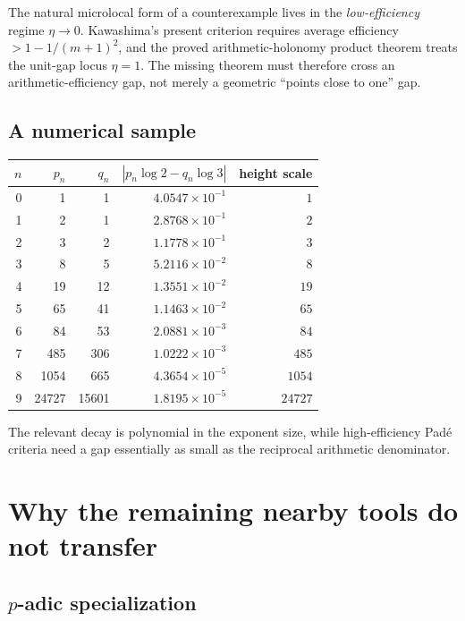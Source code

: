 \documentclass[11pt]{article}
\theoremstyle{definition}
\begin{document}
\begin{provedbox}
The natural microlocal form of a counterexample lives in the \emph{low-efficiency} regime
$\eta\to0$.  Kawashima's present criterion requires average efficiency
$>1-1/(m+1)^2$, and the proved arithmetic-holonomy product theorem treats the unit-gap locus
$\eta=1$.  The missing theorem must therefore cross an arithmetic-efficiency gap, not merely a
geometric ``points close to one'' gap.
\end{provedbox}

\subsection{A numerical sample}

\begin{center}
\begin{tabular}{@{}rrrrr@{}}
\toprule
$n$ & $p_n$ & $q_n$ & $|p_n\log2-q_n\log3|$ & height scale \\
\midrule
0 & 1 & 1 & $4.0547\times10^{-1}$ & $1$ \\
1 & 2 & 1 & $2.8768\times10^{-1}$ & $2$ \\
2 & 3 & 2 & $1.1778\times10^{-1}$ & $3$ \\
3 & 8 & 5 & $5.2116\times10^{-2}$ & $8$ \\
4 & 19 & 12 & $1.3551\times10^{-2}$ & $19$ \\
5 & 65 & 41 & $1.1463\times10^{-2}$ & $65$ \\
6 & 84 & 53 & $2.0881\times10^{-3}$ & $84$ \\
7 & 485 & 306 & $1.0222\times10^{-3}$ & $485$ \\
8 & 1054 & 665 & $4.3654\times10^{-5}$ & $1054$ \\
9 & 24727 & 15601 & $1.8195\times10^{-5}$ & $24727$ \\
\bottomrule
\end{tabular}
\end{center}

The relevant decay is polynomial in the exponent size, while high-efficiency Pad\'e criteria
need a gap essentially as small as the reciprocal arithmetic denominator.

\section{Why the remaining nearby tools do not transfer}

\subsection[p-adic specialization]{$p$-adic specialization}
\end{document}
